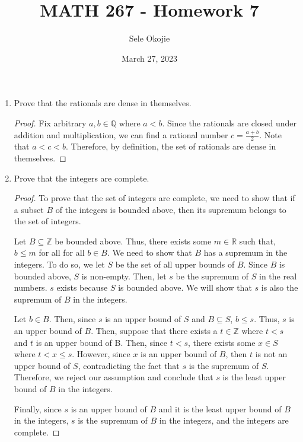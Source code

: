 \documentclass{article}
\title{MATH 267 - Homework 7}
\author{Sele Okojie}
\date{March 27, 2023}
\begin{document}
    \maketitle

    \begin{enumerate}

	\item Prove that the rationals are dense in themselves.
            \begin{proof}
                Fix arbitrary $a, b\in\mathbb{Q}$ where $a < b$. Since the rationals are closed under addition and multiplication, we can find a rational number $c = \frac{a + b}{2}$. Note that $a < c < b$. Therefore, by definition, the set of rationals are dense in themselves.
            \end{proof}

	\item Prove that the integers are complete.
            \begin{proof}
                To prove that the set of integers are complete, we need to show that if a subset $B$ of the integers is bounded above, then its supremum belongs to the set of integers. 
                \par
                \qquad\quad Let $B \subseteq \mathbb{Z}$ be bounded above. Thus, there exists some $m\in\mathbb{R}$ such that, $b \le m$ for all for all $b\in B$. We need to show that $B$ has a supremum in the integers. To do so, we let $S$ be the set of all upper bounds of $B$. Since $B$ is bounded above, $S$ is non-empty. Then, let $s$ be the supremum of $S$ in the real numbers. $s$ exists because $S$ is bounded above. We will show that $s$ is also the supremum of $B$ in the integers.
                \par 
                \qquad\quad Let $b\in B$. Then, since $s$ is an upper bound of $S$ and $B\subseteq S$, $b \le s$. Thus, $s$ is an upper bound of $B$. Then, suppose that there exists a $t \in\mathbb{Z}$ where $t < s$ and $t$ is an upper bound of B. Then, since $t < s$, there exists some $x \in S$ where $t < x \le s$. However, since $x$ is an upper bound of $B$, then $t$ is not an upper bound of $S$, contradicting the fact that $s$ is the supremum of $S$. Therefore, we reject our assumption and conclude that $s$ is the least upper bound of $B$ in the integers.
                \par
                \qquad\quad Finally, since $s$ is an upper bound of $B$ and it is the least upper bound of $B$ in the integers, $s$ is the supremum of $B$ in the integers, and the integers are complete.
            \end{proof}
        

\end{enumerate}
\end{document}

